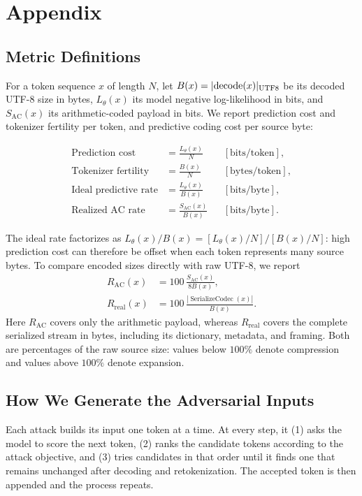 \section{Appendix}

\subsection{Metric Definitions}
For a token sequence $x$ of length $N$, let
$B(x)=\lvert \operatorname{decode}(x)\rvert_{\mathrm{UTF8}}$ be its decoded UTF-8 size in bytes,
$L_\theta(x)$ its model negative log-likelihood in bits, and
$S_{\mathrm{AC}}(x)$ its arithmetic-coded payload in bits. We report prediction
cost and tokenizer fertility per token, and predictive coding cost per source
byte:

\begin{align}
  \text{Prediction cost} &= \frac{L_\theta(x)}{N}
    && [\mathrm{bits/token}],\\
  \text{Tokenizer fertility} &= \frac{B(x)}{N}
    && [\mathrm{bytes/token}],\\
  \text{Ideal predictive rate} &= \frac{L_\theta(x)}{B(x)}
    && [\mathrm{bits/byte}],\\
  \text{Realized AC rate} &= \frac{S_{\mathrm{AC}}(x)}{B(x)}
    && [\mathrm{bits/byte}].
\end{align}

The ideal rate factorizes as
$L_\theta(x)/B(x)=[L_\theta(x)/N]/[B(x)/N]$: high prediction cost can therefore
be offset when each token represents many source bytes. To compare encoded
sizes directly with raw UTF-8, we report
\begin{align}
  R_{\mathrm{AC}}(x)
    &=100\,\frac{S_{\mathrm{AC}}(x)}{8B(x)},\\
  R_{\mathrm{real}}(x)
    &=100\,\frac{\left|\operatorname{SerializeCodec}(x)\right|}{B(x)}.
\end{align}
Here $R_{\mathrm{AC}}$ covers only the arithmetic payload, whereas
$R_{\mathrm{real}}$ covers the complete serialized stream in bytes, including
its dictionary, metadata, and framing. Both are percentages of the raw source
size: values below $100\%$ denote compression and values above $100\%$ denote
expansion.

\subsection{How We Generate the Adversarial Inputs}
\label{app:attack-algorithms}

Each attack builds its input one token at a time. At every step, it (1) asks
the model to score the next token, (2) ranks the candidate tokens according to
the attack objective, and (3) tries candidates in that order until it finds one
that remains unchanged after decoding and retokenization. The accepted token is
then appended and the process repeats.

